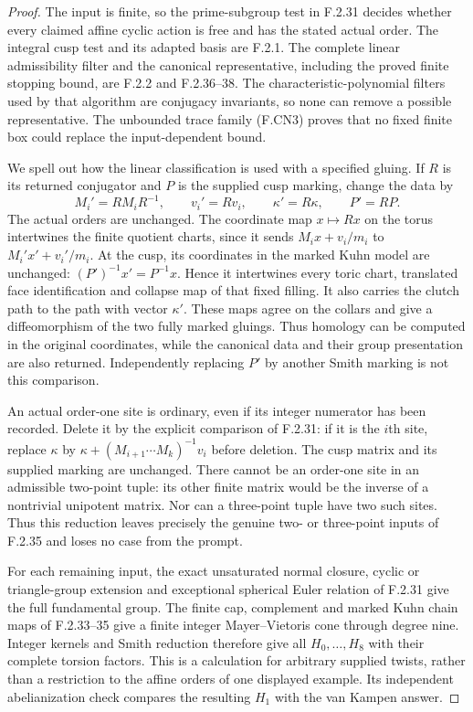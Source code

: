 \begin{proof}
The input is finite, so the prime-subgroup test in F.2.31
decides whether every claimed affine cyclic action is free
and has the stated actual order.  The integral cusp test and
its adapted basis are F.2.1.  The complete linear admissibility
filter and the canonical representative, including the proved
finite stopping bound, are F.2.2 and F.2.36--38.  The
characteristic-polynomial filters used by that algorithm are
conjugacy invariants, so none can remove a possible
representative.  The unbounded trace family (F.CN3) proves
that no fixed finite box could replace the input-dependent
bound.

We spell out how the linear classification is used with a
specified gluing.  If $R$ is its returned conjugator and
$P$ is the supplied cusp marking, change the data by
\[
 M_i'=RM_iR^{-1},\qquad v_i'=Rv_i,\qquad
 \kappa'=R\kappa,\qquad P'=RP.                           \tag{F.SY1}
\]
The actual orders are unchanged.  The coordinate map
$x\mapsto Rx$ on the torus intertwines the finite quotient
charts, since it sends $M_ix+v_i/m_i$ to
$M_i'x'+v_i'/m_i$.  At the cusp, its coordinates in the
marked Kuhn model are unchanged:
$(P')^{-1}x'=P^{-1}x$.  Hence it intertwines every toric
chart, translated face identification and collapse map of
that fixed filling.  It also carries the clutch path to
the path with vector $\kappa'$.  These maps agree on the
collars and give a diffeomorphism of the two fully marked
gluings.  Thus homology can be computed in the original
coordinates, while the canonical data and their group
presentation are also returned.  Independently replacing
$P'$ by another Smith marking is not this comparison.

An actual order-one site is ordinary, even if its integer
numerator has been recorded.  Delete it by the explicit
comparison of F.2.31: if it is the $i$th site, replace
$\kappa$ by
$\kappa+(M_{i+1}\cdots M_k)^{-1}v_i$ before deletion.
The cusp matrix and its supplied marking are unchanged.
There cannot be an order-one site in an admissible two-point
tuple: its other finite matrix would be the inverse of a
nontrivial unipotent matrix.  Nor can a three-point tuple
have two such sites.  Thus this reduction leaves precisely
the genuine two- or three-point inputs of F.2.35 and loses
no case from the prompt.

For each remaining input, the exact unsaturated normal
closure, cyclic or triangle-group extension and exceptional
spherical Euler relation of F.2.31 give the full fundamental
group.  The finite cap, complement and marked Kuhn chain
maps of F.2.33--35 give a finite integer Mayer--Vietoris cone
through degree nine.  Integer kernels and Smith reduction
therefore give all $H_0,\ldots,H_8$ with their complete
torsion factors.  This is a calculation for arbitrary
supplied twists, rather than a restriction to the affine
orders of one displayed example.  Its independent
abelianization check compares the resulting $H_1$ with the
van Kampen answer.


\end{proof}
